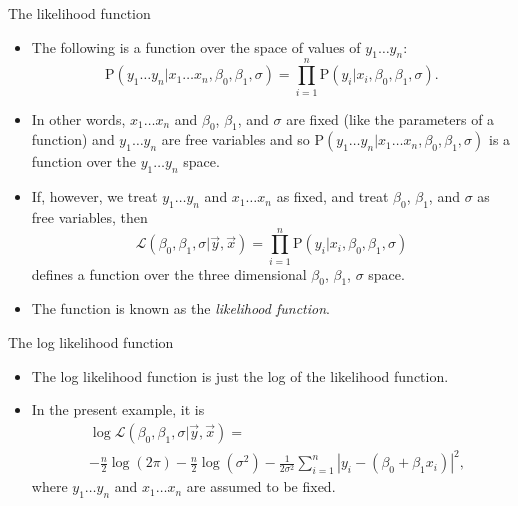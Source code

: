 \documentclass[
  10pt,
  ignorenonframetext,
]{beamer}
\providecommand{\tightlist}{%
  \setlength{\itemsep}{0pt}\setlength{\parskip}{0pt}}
\newcommand{\Prob}[1]{\mathrm{P}( #1 )}
\newcommand*{\given}{\vert}
\begin{document}
\begin{frame}{The likelihood function}
\protect\hypertarget{the-likelihood-function}{}
\begin{itemize}
\item
  The following is a function over the space of values of
  \(y_1 \ldots y_n\): \[
  \Prob{y_1 \ldots y_n \given x_1\ldots x_n, \beta_0, \beta_1, \sigma} = \prod_{i=1}^n \Prob{y_i \given x_i, \beta_0, \beta_1, \sigma}.
  \]
\item
  In other words, \(x_1\ldots x_n\) and \(\beta_0\), \(\beta_1\), and
  \(\sigma\) are fixed (like the parameters of a function) and
  \(y_1 \ldots y_n\) are free variables and so
  \(\Prob{y_1 \ldots y_n \given x_1\ldots x_n, \beta_0, \beta_1, \sigma}\)
  is a function over the \(y_1 \ldots y_n\) space.
\item
  If, however, we treat \(y_1 \ldots y_n\) and \(x_1 \ldots x_n\) as
  fixed, and treat \(\beta_0\), \(\beta_1\), and \(\sigma\) as free
  variables, then \[
  \mathcal{L}(\beta_0, \beta_1, \sigma \given \vec{y}, \vec{x}) = \prod_{i=1}^n \Prob{y_i \given x_i, \beta_0, \beta_1, \sigma}
  \] defines a function over the three dimensional \(\beta_0\),
  \(\beta_1\), \(\sigma\) space.
\item
  The function is known as the \emph{likelihood function}.
\end{itemize}
\end{frame}

\begin{frame}{The log likelihood function}
\protect\hypertarget{the-log-likelihood-function}{}
\begin{itemize}
\tightlist
\item
  The log likelihood function is just the log of the likelihood
  function.
\item
  In the present example, it is \[
  \begin{aligned}
  &\log \mathcal{L}(\beta_0, \beta_1, \sigma \given \vec{y}, \vec{x}) =\\ 
  &-\frac{n}{2} \log\left(2\pi\right) -\frac{n}{2} \log(\sigma^2) -\frac{1}{2\sigma^2} \sum_{i=1}^n |y_i - (\beta_0 + \beta_1 x_i)|^2,
  \end{aligned}
  \] where \(y_1 \ldots y_n\) and \(x_1 \ldots x_n\) are assumed to be
  fixed.
\end{itemize}
\end{frame}
\end{document}

